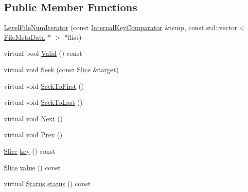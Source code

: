\subsection*{Public Member Functions}
\begin{DoxyCompactItemize}
\item 
\hyperlink{classleveldb_1_1_version_1_1_level_file_num_iterator_a7d9b5b7c74d74974ae322d20535f112a}{Level\+File\+Num\+Iterator} (const \hyperlink{classleveldb_1_1_internal_key_comparator}{Internal\+Key\+Comparator} \&icmp, const std\+::vector$<$ \hyperlink{structleveldb_1_1_file_meta_data}{File\+Meta\+Data} $\ast$ $>$ $\ast$flist)
\item 
virtual bool \hyperlink{classleveldb_1_1_version_1_1_level_file_num_iterator_afb097a457cd972895393b3fbde7e2ad2}{Valid} () const 
\item 
virtual void \hyperlink{classleveldb_1_1_version_1_1_level_file_num_iterator_adbe855f4a783c2f578e1ff2fbb5259b2}{Seek} (const \hyperlink{classleveldb_1_1_slice}{Slice} \&target)
\item 
virtual void \hyperlink{classleveldb_1_1_version_1_1_level_file_num_iterator_a8e5d34bf0c1e17e83bbb9941821a7ee2}{Seek\+To\+First} ()
\item 
virtual void \hyperlink{classleveldb_1_1_version_1_1_level_file_num_iterator_ac7fafc33c049d1e33fdf9b5ae99f73d8}{Seek\+To\+Last} ()
\item 
virtual void \hyperlink{classleveldb_1_1_version_1_1_level_file_num_iterator_a7f470d4bd4dd27ff653bd1e61ccfd759}{Next} ()
\item 
virtual void \hyperlink{classleveldb_1_1_version_1_1_level_file_num_iterator_ab39c60a98d579590231034fdb665cb42}{Prev} ()
\item 
\hyperlink{classleveldb_1_1_slice}{Slice} \hyperlink{classleveldb_1_1_version_1_1_level_file_num_iterator_a8c2ee5f532fd05b2864f8d69d5c01f45}{key} () const 
\item 
\hyperlink{classleveldb_1_1_slice}{Slice} \hyperlink{classleveldb_1_1_version_1_1_level_file_num_iterator_ac09a8ed595aca29d90e6af91e80a4f00}{value} () const 
\item 
virtual \hyperlink{classleveldb_1_1_status}{Status} \hyperlink{classleveldb_1_1_version_1_1_level_file_num_iterator_a98bae41a244b6a5a6675a7f7b322281d}{status} () const 
\end{DoxyCompactItemize}
